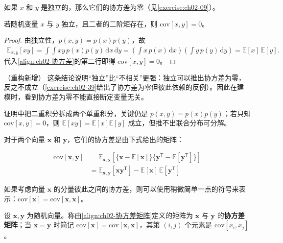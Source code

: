 \documentclass[../../main.tex]{subfiles}
\begin{document}
如果 $x$ 和 $y$ 是独立的，那么它们的协方差为零（见\cref{exercise:ch02-09}）。

\begin{proposition}[独立变量的协方差为零]\label{proposition:ch02-独立协方差为零}
若随机变量 $x$ 与 $y$ 独立，且二者的二阶矩存在，则 $\mathrm{cov}[x,y]=0$。
\end{proposition}

\begin{proof}
由独立性，$p(x,y)=p(x)p(y)$，故
\begin{align*}
  \mathbb{E}_{x,y}[xy] = \int\!\!\int xy\,p(x)p(y)\,\mathrm{d}x\,\mathrm{d}y
  = \left(\int x\,p(x)\,\mathrm{d}x\right)\left(\int y\,p(y)\,\mathrm{d}y\right) = \mathbb{E}[x]\,\mathbb{E}[y] .
\end{align*}
代入\eqref{align:ch02-协方差}的第二行即得 $\mathrm{cov}[x,y]=0$。
\end{proof}

\begin{remark}（重构新增）
这条结论说明“独立”比“不相关”更强：独立可以推出协方差为零，反之不成立（\cref{exercise:ch02-39}给出了协方差为零但彼此依赖的反例）。因此在建模时，看到协方差为零不能直接断定变量无关。

证明中把二重积分拆成两个单重积分，关键仍是 $p(x,y)=p(x)p(y)$；若只知 $\mathrm{cov}[x,y]=0$，则 $\mathbb{E}[xy]=\mathbb{E}[x]\mathbb{E}[y]$ 成立，但推不出联合分布可分解。
\end{remark}

对于两个向量 $\mathbf{x}$ 和 $\mathbf{y}$，它们的协方差是由下式给出的矩阵：

\begin{align}
  \mathrm{cov}[\mathbf{x},\mathbf{y}] &= \mathbb{E}_{\mathbf{x},\mathbf{y}}\left[\big\{\mathbf{x}-\mathbb{E}[\mathbf{x}]\big\}\big\{\mathbf{y}^{\mathsf{T}}-\mathbb{E}[\mathbf{y}^{\mathsf{T}}]\big\}\right] \nonumber \\
  &= \mathbb{E}_{\mathbf{x},\mathbf{y}}\left[\mathbf{x}\mathbf{y}^{\mathsf{T}}\right] - \mathbb{E}[\mathbf{x}]\,\mathbb{E}[\mathbf{y}^{\mathsf{T}}]
  \label{align:ch02-协方差矩阵}
\end{align}

如果考虑向量 $\mathbf{x}$ 的分量彼此之间的协方差，则可以使用稍微简单一点的符号来表示：$\mathrm{cov}[\mathbf{x}]=\mathrm{cov}[\mathbf{x},\mathbf{x}]$。

\begin{definition}[协方差矩阵]\label{definition:ch02-协方差矩阵}
设 $\mathbf{x},\mathbf{y}$ 为随机向量。称由\eqref{align:ch02-协方差矩阵}定义的矩阵为 $\mathbf{x}$ 与 $\mathbf{y}$ 的\textbf{协方差矩阵}；当 $\mathbf{x}=\mathbf{y}$ 时简记 $\mathrm{cov}[\mathbf{x}]=\mathrm{cov}[\mathbf{x},\mathbf{x}]$，其第 $(i,j)$ 个元素是 $\mathrm{cov}[x_i,x_j]$。
\end{definition}
\end{document}
